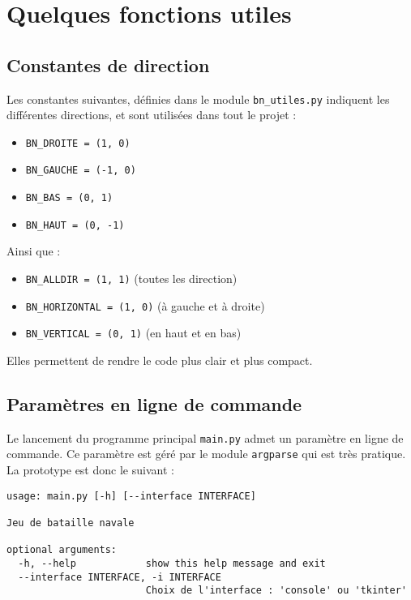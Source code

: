 \chapter{Quelques fonctions utiles}

\section{Constantes de direction}
Les constantes suivantes, définies dans le module \texttt{bn\_utiles.py} indiquent les différentes directions, et sont utilisées dans tout le projet :
\begin{itemize}
\item \texttt{BN\_DROITE = (1, 0)}
\item \texttt{BN\_GAUCHE = (-1, 0)}
\item \texttt{BN\_BAS = (0, 1)}
\item \texttt{BN\_HAUT = (0, -1)}
\end{itemize}
Ainsi que :
\begin{itemize}
\item \texttt{BN\_ALLDIR = (1, 1)} (toutes les direction)
\item \texttt{BN\_HORIZONTAL = (1, 0)} (à gauche et à droite)
\item \texttt{BN\_VERTICAL = (0, 1)} (en haut et en bas)
\end{itemize}
Elles permettent de rendre le code plus clair et plus compact.

\section{Paramètres en ligne de commande}
Le lancement du programme principal \texttt{main.py} admet un paramètre en ligne de commande. Ce paramètre est géré par le module \texttt{argparse} qui est très pratique. La prototype est donc le suivant :

\begin{verbatim}
usage: main.py [-h] [--interface INTERFACE]

Jeu de bataille navale

optional arguments:
  -h, --help            show this help message and exit
  --interface INTERFACE, -i INTERFACE
                        Choix de l'interface : 'console' ou 'tkinter'
\end{verbatim}